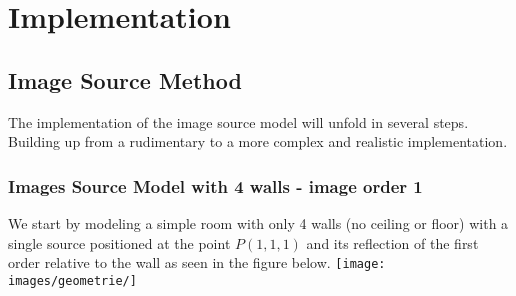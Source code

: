 \chapter{Implementation}
\label{chap:implementation}
\section{Image Source Method}
The implementation of the image source model will unfold in several steps. Building up from a rudimentary to a more complex and realistic implementation.
\subsection{Images Source Model with 4 walls - image order 1}
We start by modeling a simple room with only 4 walls (no ceiling or floor) with a single source positioned at the point $P(1,1,1)$ and its reflection of the first order relative to the wall as seen in the figure below.
\texttt{[image: images/geometrie/]}
